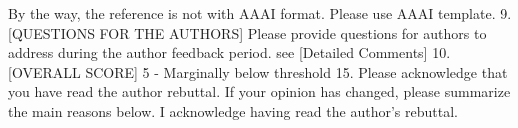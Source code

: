 By the way, the reference is not with AAAI format. Please use AAAI template.
9. [QUESTIONS FOR THE AUTHORS] Please provide questions for authors to address during the author feedback period.
see [Detailed Comments]
10. [OVERALL SCORE]
5 - Marginally below threshold
15. Please acknowledge that you have read the author rebuttal. If your opinion has changed, please summarize the main reasons below.
I acknowledge having read the author's rebuttal.
